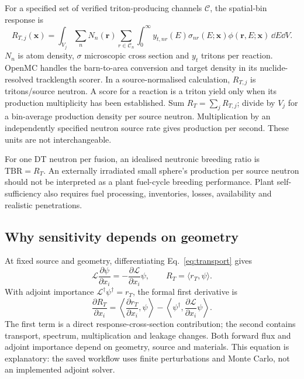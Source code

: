 For a specified set of verified triton-producing channels $\mathcal C$, the spatial-bin response is
\begin{equation}
R_{T,j}(\bm x)=\int_{V_j}\!\sum_n N_n(\bm r)\sum_{r\in\mathcal C_n}
\int_0^\infty y_{t,nr}(E)\sigma_{nr}(E;\bm x)\phi(\bm r,E;\bm x)\,\dd E\dd V.\label{eq:rate}
\end{equation}
$N_n$ is atom density, $\sigma$ microscopic cross section and $y_t$ tritons per reaction. OpenMC handles the barn-to-area conversion and target density in its nuclide-resolved tracklength scorer. In a source-normalised calculation, $R_{T,j}$ is tritons/source neutron. A score for a reaction is a triton yield only when its production multiplicity has been established. Sum $R_T=\sum_jR_{T,j}$; divide by $V_j$ for a bin-average production density per source neutron. Multiplication by an independently specified neutron source rate gives production per second. These units are not interchangeable.

For one DT neutron per fusion, an idealised neutronic breeding ratio is $\mathrm{TBR}=R_T$. An externally irradiated small sphere's production per source neutron should not be interpreted as a plant fuel-cycle breeding performance. Plant self-sufficiency also requires fuel processing, inventories, losses, availability and realistic penetrations.

\subsection{Why sensitivity depends on geometry}
At fixed source and geometry, differentiating Eq.~\eqref{eq:transport} gives
\begin{equation}
\mathcal L\frac{\partial\psi}{\partial x_i}=-\frac{\partial\mathcal L}{\partial x_i}\psi,
\qquad R_T=\langle r_T,\psi\rangle.
\end{equation}
With adjoint importance $\mathcal L^\dagger\psi^\dagger=r_T$, the formal first derivative is
\begin{equation}
\frac{\partial R_T}{\partial x_i}=\left\langle\frac{\partial r_T}{\partial x_i},\psi\right\rangle
-\left\langle\psi^\dagger,\frac{\partial\mathcal L}{\partial x_i}\psi\right\rangle.\label{eq:adjoint}
\end{equation}
The first term is a direct response-cross-section contribution; the second contains transport, spectrum, multiplication and leakage changes. Both forward flux and adjoint importance depend on geometry, source and materials. This equation is explanatory: the saved workflow uses finite perturbations and Monte Carlo, not an implemented adjoint solver.

